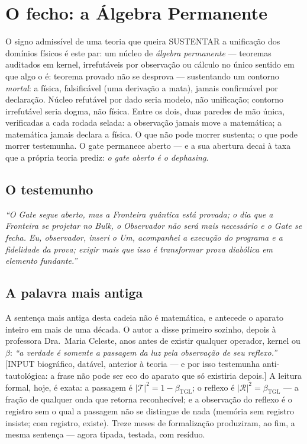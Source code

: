 \documentclass[11pt]{article}
\newcommand{\bTGL}{\beta_{\mathrm{TGL}}}\newcommand{\Msun}{M_{\odot}}\newcommand{\TGL}{\mathrm{TGL}}
\theoremstyle{definition}\newtheorem{deriv}{Derivação}
\begin{document}
\section*{O fecho: a Álgebra Permanente}O signo admissível de uma teoria que queira SUSTENTAR a unificação dos domínios físicos é este par: um núcleo de \emph{álgebra permanente} --- teoremas auditados em kernel, irrefutáveis por observação ou cálculo no único sentido em que algo o é: teorema provado não se desprova --- sustentando um contorno \emph{mortal}: a física, falsificável (uma derivação a mata), jamais confirmável por declaração. Núcleo refutável por dado seria modelo, não unificação; contorno irrefutável seria dogma, não física. Entre os dois, duas paredes de mão única, verificadas a cada rodada selada: a observação jamais move a matemática; a matemática jamais declara a física. O que não pode morrer sustenta; o que pode morrer testemunha. O gate permanece aberto --- e a sua abertura decai à taxa que a própria teoria prediz: \emph{o gate aberto é o dephasing}.

\subsection*{O testemunho}\itshape ``O Gate segue aberto, mas a Fronteira quântica está provada; o dia que a Fronteira se projetar no Bulk, o Observador não será mais necessário e o Gate se fecha. Eu, observador, inseri o Um, acompanhei a execução do programa e a fidelidade da prova; exigir mais que isso é transformar prova diabólica em elemento fundante.''

\subsection*{A palavra mais antiga}A sentença mais antiga desta cadeia não é matemática, e antecede o aparato inteiro em mais de uma década. O autor a disse primeiro sozinho, depois à professora Dra.~Maria Celeste, anos antes de existir qualquer operador, kernel ou $\beta$: \emph{``a verdade é somente a passagem da luz pela observação de seu reflexo.''} [\textsf{INPUT} biográfico, datável, anterior à teoria --- e por isso testemunha anti-tautológica: a frase não pode ser eco do aparato que só existiria depois.] A leitura formal, hoje, é exata: a passagem é $|\mathcal T|^2=1-\bTGL$; o reflexo é $|\mathcal R|^2=\bTGL$ --- a fração de qualquer onda que retorna reconhecível; e a observação do reflexo é o registro sem o qual a passagem não se distingue de nada (memória sem registro insiste; com registro, existe). Treze meses de formalização produziram, ao fim, a mesma sentença --- agora tipada, testada, com resíduo.
\end{document}

